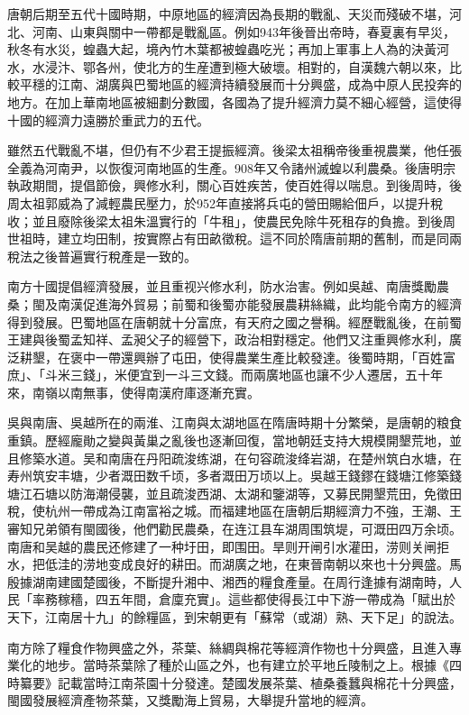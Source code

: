 唐朝后期至五代十國時期，中原地區的經濟因為長期的戰亂、天災而殘破不堪，河北、河南、山東與關中一帶都是戰亂區。例如943年後晉出帝時，春夏裏有早災，秋冬有水災，蝗蟲大起，境內竹木葉都被蝗蟲吃光；再加上軍事上人為的決黃河水，水浸汴、鄂各州，使北方的生産遭到極大破壞。相對的，自漢魏六朝以來，比較平穩的江南、湖廣與巴蜀地區的經濟持續發展而十分興盛，成為中原人民投奔的地方。在加上華南地區被細劃分數國，各國為了提升經濟力莫不細心經營，這使得十國的經濟力遠勝於重武力的五代。

雖然五代戰亂不堪，但仍有不少君王提振經濟。後梁太祖稱帝後重視農業，他任張全義為河南尹，以恢復河南地區的生產。908年又令諸州滅蝗以利農桑。後唐明宗執政期間，提倡節儉，興修水利，關心百姓疾苦，使百姓得以喘息。到後周時，後周太祖郭威為了減輕農民壓力，於952年直接將兵屯的營田賜給佃戶，以提升稅收；並且廢除後梁太祖朱溫實行的「牛租」，使農民免除牛死租存的負擔。到後周世祖時，建立均田制，按實際占有田畝徵稅。這不同於隋唐前期的舊制，而是同兩稅法之後普遍實行稅產是一致的。

南方十國提倡經濟發展，並且重视兴修水利，防水治害。例如吳越、南唐獎勵農桑；閩及南漢促進海外貿易；前蜀和後蜀亦能發展農耕絲織，此均能令南方的經濟得到發展。巴蜀地區在唐朝就十分富庶，有天府之國之譽稱。經歷戰亂後，在前蜀王建與後蜀孟知祥、孟昶父子的經營下，政治相對穩定。他們又注重興修水利，廣泛耕墾，在褒中一帶還興辦了屯田，使得農業生產比較發達。後蜀時期，「百姓富庶」、「斗米三錢」，米便宜到一斗三文錢。而兩廣地區也讓不少人遷居，五十年來，南嶺以南無事，使得南漢府庫逐漸充實。

吳與南唐、吳越所在的兩淮、江南與太湖地區在隋唐時期十分繁榮，是唐朝的粮食重鎮。歷經龐勛之變與黃巢之亂後也逐漸回復，當地朝廷支持大規模開墾荒地，並且修築水道。吴和南唐在丹阳疏浚练湖，在句容疏浚绛岩湖，在楚州筑白水塘，在寿州筑安丰塘，少者溉田数千顷，多者溉田万顷以上。吳越王錢鏐在錢塘江修築錢塘江石塘以防海潮侵襲，並且疏浚西湖、太湖和鑒湖等，又募民開墾荒田，免徵田稅，使杭州一帶成為江南富裕之城。而福建地區在唐朝后期經濟力不強，王潮、王審知兄弟領有閩國後，他們勸民農桑，在连江县车湖周围筑堤，可溉田四万余顷。南唐和吴越的農民还修建了一种圩田，即围田。旱则开闸引水灌田，涝则关闸拒水，把低洼的涝地变成良好的耕田。而湖廣之地，在東晉南朝以來也十分興盛。馬殷據湖南建國楚國後，不斷提升湘中、湘西的糧食產量。在周行逢據有湖南時，人民「率務稼穡，四五年間，倉廩充實」。這些都使得長江中下游一帶成為「賦出於天下，江南居十九」的餘糧區，到宋朝更有「蘇常（或湖）熟、天下足」的說法。

南方除了糧食作物興盛之外，茶葉、絲綢與棉花等經濟作物也十分興盛，且進入專業化的地步。當時茶葉除了種於山區之外，也有建立於平地丘陵制之上。根據《四時纂要》記載當時江南茶園十分發達。楚國发展茶葉、植桑養蠶與棉花十分興盛，閩國發展經濟產物茶葉，又獎勵海上貿易，大舉提升當地的經濟。


